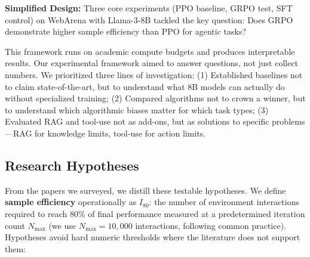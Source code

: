 \documentclass[12pt,a4paper]{report}
\theoremstyle{definition}
\begin{document}
\textbf{Simplified Design:} Three core experiments (PPO baseline, GRPO test, SFT control) on WebArena with Llama-3-8B tackled the key question: Does GRPO demonstrate higher sample efficiency than PPO for agentic tasks?

This framework runs on academic compute budgets and produces interpretable results.
Our experimental framework aimed to answer questions, not just collect numbers. We prioritized three lines of investigation: (1) Established baselines not to claim state-of-the-art, but to understand what 8B models can actually do without specialized training; (2) Compared algorithms not to crown a winner, but to understand which algorithmic biases matter for which task types; (3) Evaluated RAG and tool-use not as add-ons, but as solutions to specific problems---RAG for knowledge limits, tool-use for action limits.

\subsection{Research Hypotheses}
From the papers we surveyed, we distill these testable hypotheses. We define \textbf{sample efficiency} operationally as $I_{80}$: the number of environment interactions required to reach 80\% of final performance measured at a predetermined iteration count $N_{\max}$ (we use $N_{\max} = 10{,}000$ interactions, following common practice). Hypotheses avoid hard numeric thresholds where the literature does not support them:
\end{document}
